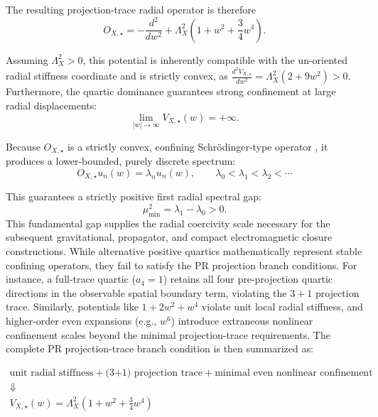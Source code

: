 \documentclass[11pt]{article}
\begin{document}
The resulting projection-trace radial operator is therefore
\begin{equation}
    \boxed{ O_{X,\star} = -\frac{d^2}{dw^2} + \Lambda_X^2 \left( 1 + w^2 + \frac{3}{4}w^4 \right). }
\end{equation}

Assuming \(\Lambda_X^2 > 0\), this potential is inherently compatible with the un-oriented radial stiffness coordinate and is strictly convex, as \(\frac{d^2V_{X,\star}}{dw^2} = \Lambda_X^2(2+9w^2) > 0\). Furthermore, the quartic dominance guarantees strong confinement at large radial displacements:
\begin{equation}
    \boxed{ \lim_{|w|\rightarrow\infty} V_{X,\star}(w) = +\infty. }
\end{equation}

Because \(O_{X,\star}\) is a strictly convex, confining Schrödinger-type operator \cite{schrodinger1926}, it produces a lower-bounded, purely discrete spectrum:
\begin{equation}
    \boxed{ O_{X,\star}u_n(w) = \lambda_n u_n(w), \qquad \lambda_0 < \lambda_1 < \lambda_2 < \cdots }
\end{equation}

This guarantees a strictly positive first radial spectral gap:
\begin{equation}
    \boxed{ \mu_{\min}^2 = \lambda_1 - \lambda_0 > 0. }
\end{equation}
This fundamental gap supplies the radial coercivity scale necessary for the subsequent gravitational, propagator, and compact electromagnetic closure constructions. While alternative positive quartics mathematically represent stable confining operators, they fail to satisfy the PR projection branch conditions. For instance, a full-trace quartic (\(a_4=1\)) retains all four pre-projection quartic directions in the observable spatial boundary term, violating the \(3+1\) projection trace. Similarly, potentials like \(1+2w^2+w^4\) violate unit local radial stiffness, and higher-order even expansions (e.g., \(w^6\)) introduce extraneous nonlinear confinement scales beyond the minimal projection-trace requirements. The complete PR projection-trace branch condition is then summarized as:

\begin{equation}
\boxed{
\begin{gathered}
\text{unit radial stiffness} + \text{(3+1) projection trace} 
{}+ \text{minimal even nonlinear confinement} \\
\Downarrow \\
V_{X,\star}(w) = \Lambda_X^2 \left( 1+w^2+\frac{3}{4}w^4 \right)
\end{gathered}
}
\end{equation}
\end{document}
